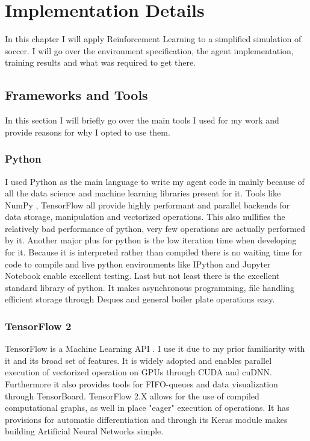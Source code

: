 \chapter{Implementation Details}\label{chap:in_practice}
In this chapter I will apply Reinforcement Learning to a simplified simulation of soccer. I will go over the environment specification, the agent implementation, training results and what was required to get there.

\section{Frameworks and Tools}\label{sec:ip:tools}
In this section I will briefly go over the main tools I used for my work and provide reasons for why I opted to use them.
\subsection{Python}\label{subsec:ip:tools:python}
I used Python as the main language to write my agent code in mainly because of all the data science and machine learning libraries present for it. Tools like NumPy \cite{noauthor_numpy_nodate}, TensorFlow all provide highly performant and parallel backends for data storage, manipulation and vectorized operations. This also nullifies the relatively bad performance of python, very few operations are actually performed by it.
\nolinebreak
Another major plus for python is the low iteration time when developing for it. Because it is interpreted rather than compiled there is no waiting time for code to compile and live python environments like IPython \cite{noauthor_ipython_nodate} and Jupyter Notebook \cite{noauthor_jupyter_nodate} enable excellent testing.
\nolinebreak
Last but not least there is the excellent standard library of python. It makes asynchronous programming, file handling efficient storage through Deques and general boiler plate operations easy.

\subsection{TensorFlow 2}\label{subsec:ip:tools:tensorflow}
TensorFlow is a Machine Learning API \cite{noauthor_tensorflow_nodate}. I use it due to my prior familiarity with it and its broad set of features. It is widely adopted and enables parallel execution of vectorized operation on GPUs through CUDA and cuDNN. Furthermore it also provides tools for FIFO-queues and data visualization through TensorBoard. TensorFlow 2.X allows for the use of compiled computational graphs, as well in place "eager" execution of operations. It has provisions for automatic differentiation and through its Keras module makes building Artificial Neural Networks simple.

